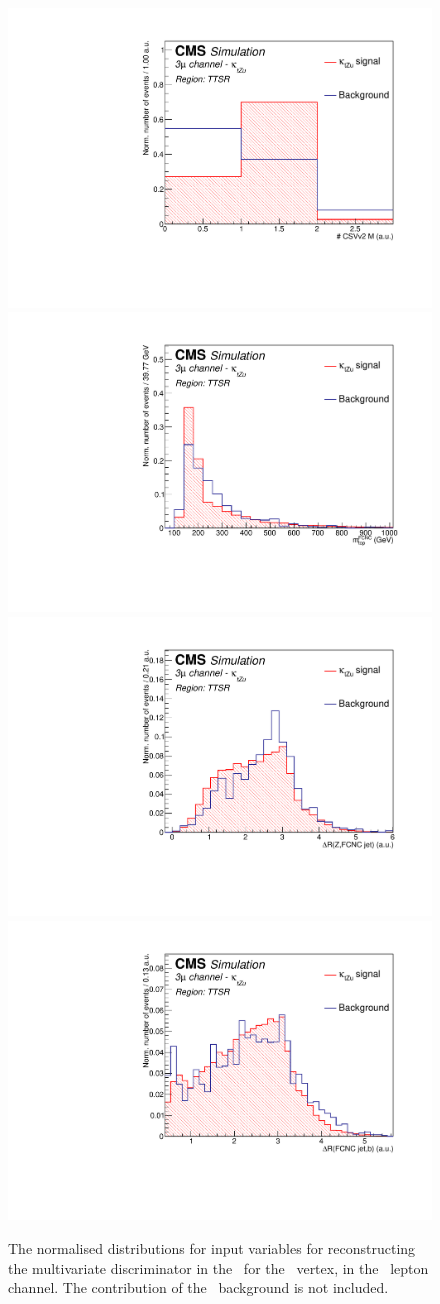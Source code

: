 \begin{figure}[htbp]
	\includegraphics[width=0.3\linewidth]{6_Search/Figures/PlotsTechnics/NJets_CSVv2MZuttoppairuuu_norm}
	\includegraphics[width=0.3\linewidth]{6_Search/Figures/PlotsTechnics/FCNCtop_MZuttoppairuuu_norm}
	\includegraphics[width=0.3\linewidth]{6_Search/Figures/PlotsTechnics/dRZcZuttoppairuuu_norm}
	\includegraphics[width=0.3\linewidth]{6_Search/Figures/PlotsTechnics/dRSMjetLightjetZuttoppairuuu_norm}
	\caption{The normalised distributions for input variables for reconstructing the multivariate discriminator in the \TTSR\ for the \Zut\ vertex, in the \mumumu\ lepton channel. The contribution of the \NPL\ background is not included.}
	\label{fig:toppairZutnormalizeduuu}
\end{figure}

